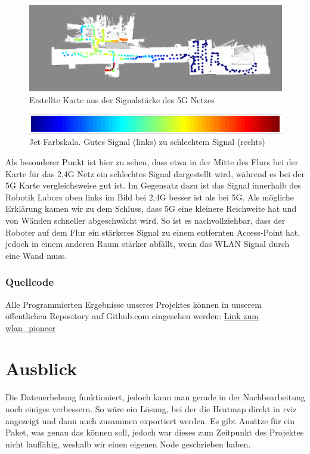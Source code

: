 \documentclass{scrartcl}%
\begin{document}
\begin{figure}[h!]
	\centering
	\includegraphics[width=\textwidth]{bilder/wlan-heatmap-5G.png}
	\caption{Erstellte Karte aus der Signalstärke des 5G Netzes}
	\label{5g}
\end{figure}

\begin{figure}[h!]
	\centering
	\includegraphics[width=\textwidth]{bilder/JetFarbskala.png}
	\caption{Jet Farbskala. Gutes Signal (links) zu schlechtem Signal (rechts)}
	\label{skala}
\end{figure}

Als besonderer Punkt ist hier zu sehen, dass etwa in der Mitte des Flurs bei der Karte für das 2,4G Netz ein schlechtes Signal dargestellt wird, während es bei der 5G Karte vergleichsweise gut ist. Im Gegensatz dazu ist das Signal innerhalb des Robotik Labors oben links im Bild bei 2,4G besser ist als bei 5G. Als mögliche Erklärung kamen wir zu dem Schluss, dass 5G eine kleinere Reichweite hat und von Wänden schneller abgeschwächt wird. So ist es nachvollziehbar, dass der Roboter auf dem Flur ein stärkeres Signal zu einem entfernten Access-Point hat, jedoch in einem anderen Raum stärker abfällt, wenn das WLAN Signal durch eine Wand muss.

\subsubsection{Quellcode}
Alle Programmierten Ergebnisse unseres Projektes können in unserem öffentlichen Repository auf Github.com eingesehen werden: \href{https://github.com/fzirker/wlan_pioneer}{Link zum wlan\_pioneer}

\newpage
\section{Ausblick}
Die Datenerhebung funktioniert, jedoch kann man gerade in der Nachbearbeitung noch einiges verbessern. So wäre ein Lösung, bei der die Heatmap direkt in rviz angezeigt und dann auch zusammen exportiert werden. Es gibt Ansätze für ein Paket, was genau das können soll, jedoch war dieses zum Zeitpunkt des Projektes nicht lauffähig, weshalb wir einen eigenen Node geschrieben haben.
\end{document}
